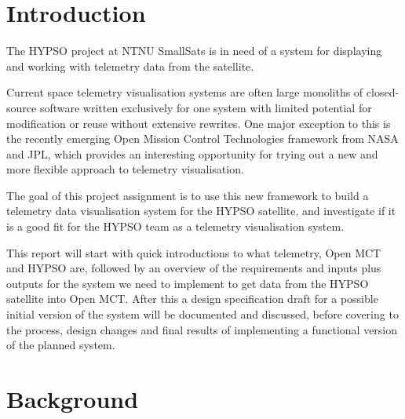 \begin{comment}
Background
 - Smallsats
 - Mission planning and execution
 - Current telemetry display solutions
   - Large custom-made software suites, single-purpose - large time requirements for implementation and change

Motivation
 - NTNU SmallSat/HYPSO
 - Spacecraft telemetry
 - How should one display and process telemetry?
 - Why Open MCT works for this
   - Open framework, used by NASA on multiple projects; one of the few frameworks of its type that’s available to the public
   -Wanted to implement a well-documented and expandable solution for this; Open MCT has few existing implementations, as it is a fairly new framework - largely minor modifications of the tutorial
\end{comment}

\section{Introduction}

The HYPSO project at NTNU SmallSats is in need of a system for displaying and working with telemetry data from the satellite.

Current space telemetry visualisation systems are often large monoliths of closed-source software written exclusively for one system with limited potential for modification or reuse without extensive rewrites. One major exception to this is the recently emerging Open Mission Control Technologies framework from NASA and JPL, which provides an interesting opportunity for trying out a new and more flexible approach to telemetry visualisation.

The goal of this project assignment is to use this new framework to build a telemetry data visualisation system for the HYPSO satellite, and investigate if it is a good fit for the HYPSO team as a telemetry visualisation system.

This report will start with quick introductions to what telemetry, Open MCT and HYPSO are, followed by an overview of the requirements and inputs plus outputs for the system we need to implement to get data from the HYPSO satellite into Open MCT. After this a design specification draft for a possible initial version of the system will be documented and discussed, before covering to the process, design changes and final results of implementing a functional version of the planned system.

\section{Background}

